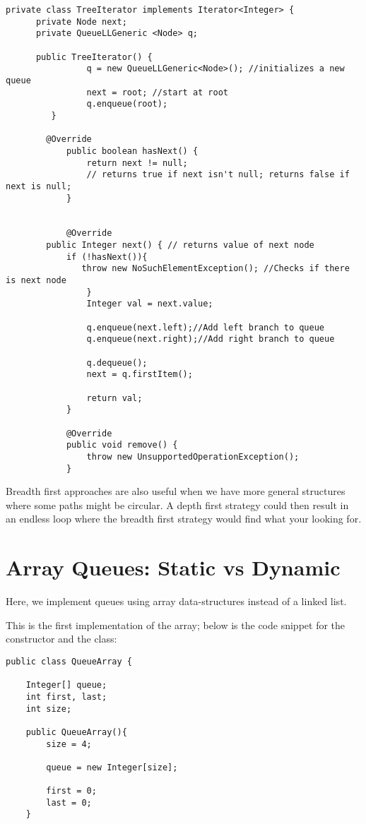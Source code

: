 \documentclass[a4paper,11pt]{article}
\begin{document}
\begin{verbatim}
private class TreeIterator implements Iterator<Integer> {
      private Node next;
      private QueueLLGeneric <Node> q;
            
      public TreeIterator() {
                q = new QueueLLGeneric<Node>(); //initializes a new queue
                next = root; //start at root
                q.enqueue(root);
         }
            
        @Override
            public boolean hasNext() {
                return next != null; 
                // returns true if next isn't null; returns false if next is null;
            }
            
            
            @Override
        public Integer next() { // returns value of next node
            if (!hasNext()){
               throw new NoSuchElementException(); //Checks if there is next node
                }
                Integer val = next.value;
                
                q.enqueue(next.left);//Add left branch to queue
                q.enqueue(next.right);//Add right branch to queue
                
                q.dequeue();
                next = q.firstItem();
            
                return val;
            }
            
            @Override
            public void remove() {
                throw new UnsupportedOperationException();
            }
\end{verbatim}
Breadth first approaches are also useful when we have more general structures where some paths might be circular. A depth first strategy could then result in an endless loop where the breadth first strategy would find what your looking for.

\section*{Array Queues: Static vs Dynamic}
Here, we implement queues using array data-structures instead of a linked list. 

This is the first implementation of the array; below is the code snippet for the constructor and the class:

\begin{verbatim}
public class QueueArray {

    Integer[] queue;
    int first, last;
    int size;
    
    public QueueArray(){
        size = 4;

        queue = new Integer[size];

        first = 0;
        last = 0;
    }
\end{verbatim}
\end{document}
